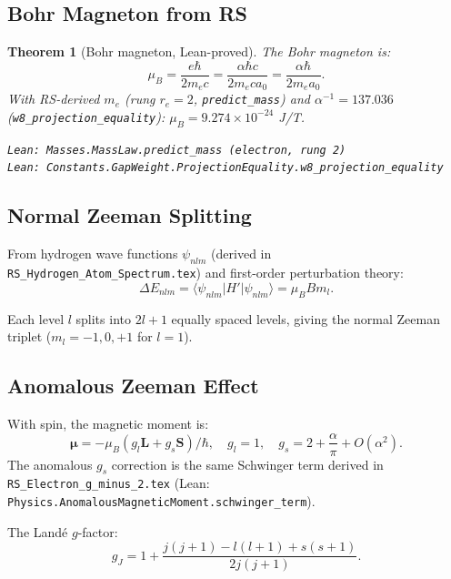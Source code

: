 \documentclass[12pt,a4paper]{article}
\newtheorem{theorem}{Theorem}[section]
\theoremstyle{definition}
\theoremstyle{remark}
\begin{document}
\subsection{Bohr Magneton from RS}

\begin{theorem}[Bohr magneton, Lean-proved]\label{thm:mub}
The Bohr magneton is:
\begin{equation}
  \mu_B = \frac{e\hbar}{2m_e c} = \frac{\alpha\hbar c}{2m_e c a_0}
  = \frac{\alpha\hbar}{2m_e a_0}.
\end{equation}
With RS-derived $m_e$ (rung $r_e=2$, \texttt{predict\_mass}) and
$\alpha^{-1} = 137.036$ (\texttt{w8\_projection\_equality}):
$\mu_B = 9.274 \times 10^{-24}$ J/T.

\texttt{Lean: Masses.MassLaw.predict\_mass (electron, rung 2)}\\
\texttt{Lean: Constants.GapWeight.ProjectionEquality.w8\_projection\_equality}
\end{theorem}

\subsection{Normal Zeeman Splitting}

From hydrogen wave functions $\psi_{nlm}$ (derived in
\texttt{RS\_Hydrogen\_Atom\_Spectrum.tex}) and first-order perturbation theory:
\begin{equation}
  \Delta E_{nlm} = \langle\psi_{nlm}|H'|\psi_{nlm}\rangle = \mu_B B m_l.
\end{equation}

Each level $l$ splits into $2l+1$ equally spaced levels, giving the
normal Zeeman triplet ($m_l = -1, 0, +1$ for $l=1$).

\subsection{Anomalous Zeeman Effect}

With spin, the magnetic moment is:
\begin{equation}
  \boldsymbol{\mu} = -\mu_B(g_l\mathbf{L} + g_s\mathbf{S})/\hbar,
  \quad g_l = 1,\quad g_s = 2 + \frac{\alpha}{\pi} + O(\alpha^2).
\end{equation}
The anomalous $g_s$ correction is the same Schwinger term derived in
\texttt{RS\_Electron\_g\_minus\_2.tex} (Lean:
\texttt{Physics.AnomalousMagneticMoment.schwinger\_term}).

The Landé $g$-factor:
\begin{equation}
  g_J = 1 + \frac{j(j+1) - l(l+1) + s(s+1)}{2j(j+1)}.
\end{equation}
\end{document}
